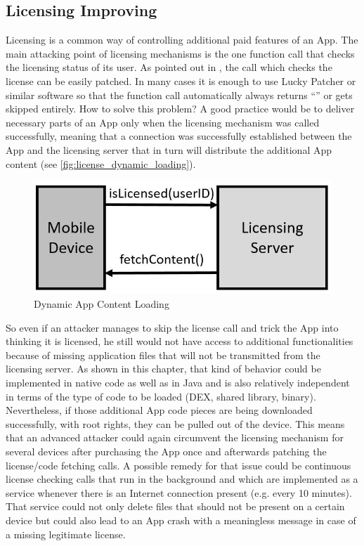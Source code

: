 \subsection{Licensing Improving}
Licensing is a common way of controlling additional paid
features of an App. The main attacking point of licensing mechanisms is the one
function call that checks the licensing status of its user. As pointed
out in \parencite{app_sec}, the call which checks the license can be easily patched. In many cases it is enough to use Lucky Patcher or similar software so that the function call automatically always returns ``'' or gets skipped entirely. How to solve this problem? A good practice would be to deliver necessary parts of an App only when the licensing mechanism was
called successfully, meaning that a connection was successfully established between the App and the licensing server that in turn will distribute the additional App content (see \autoref{fig:license_dynamic_loading}).
\begin{figure}[htb]
  \centering
  \includegraphics[scale=0.5]{figures/license_dynamic_loading}
  \caption[Dynamic App Content Loading]{Dynamic App Content Loading}
  \label{fig:license_dynamic_loading}
\end{figure}
So even if an attacker manages to skip the license call and trick the App
into thinking it is licensed, he still would not have access to additional
functionalities because of missing application files that will not be
transmitted from the licensing server. As shown in this chapter,
that kind of behavior could be implemented in native code as well as in Java and
is also relatively independent in terms of the type of code to be loaded (DEX,
shared library, binary). Nevertheless, if those additional App code pieces are being downloaded successfully, with root rights, they can be pulled out of the
device. This means that an advanced attacker could again circumvent the licensing mechanism for several devices after purchasing the App once and afterwards patching
the license/code fetching calls.
A possible remedy for that issue could be continuous license checking calls that run in the
background and which are implemented as a service whenever there is an Internet connection present (e.g. every 10 minutes). That service could not only delete
files that should not be present on a certain device but could also lead to an
App crash with a meaningless message in case of a missing legitimate license.

